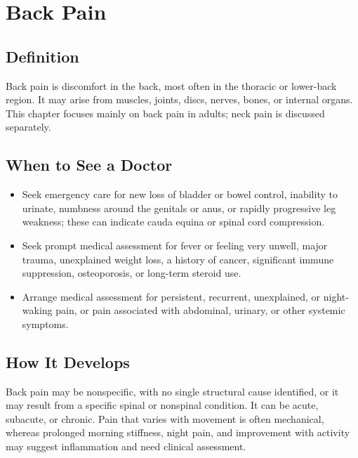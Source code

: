 \chapter{Back Pain}

\section*{Definition}
Back pain is discomfort in the back, most often in the thoracic or lower-back region. It may arise from muscles, joints, discs, nerves, bones, or internal organs. This chapter focuses mainly on back pain in adults; neck pain is discussed separately.

\section*{When to See a Doctor}

\begin{itemize}
 \item Seek emergency care for new loss of bladder or bowel control, inability to urinate, numbness around the genitals or anus, or rapidly progressive leg weakness; these can indicate cauda equina or spinal cord compression.
 \item Seek prompt medical assessment for fever or feeling very unwell, major trauma, unexplained weight loss, a history of cancer, significant immune suppression, osteoporosis, or long-term steroid use.
 \item Arrange medical assessment for persistent, recurrent, unexplained, or night-waking pain, or pain associated with abdominal, urinary, or other systemic symptoms.
\end{itemize}

\section*{How It Develops}
Back pain may be nonspecific, with no single structural cause identified, or it may result from a specific spinal or nonspinal condition. It can be acute, subacute, or chronic. Pain that varies with movement is often mechanical, whereas prolonged morning stiffness, night pain, and improvement with activity may suggest inflammation and need clinical assessment.

